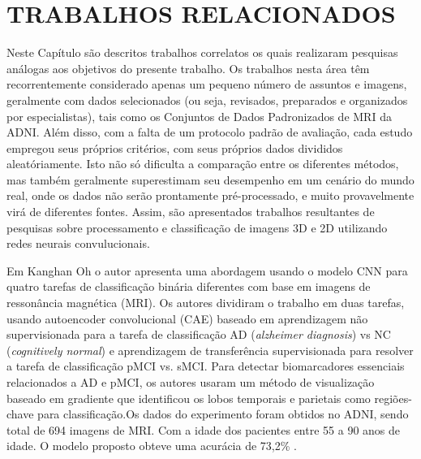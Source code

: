 \documentclass[openright]{UFRGS} %
\begin{document}
\chapter{TRABALHOS RELACIONADOS}

Neste Capítulo são descritos trabalhos correlatos os quais realizaram pesquisas análogas
aos objetivos do presente trabalho. Os trabalhos nesta área têm recorrentemente considerado apenas um pequeno número de assuntos e
imagens, geralmente com dados selecionados (ou seja, revisados, preparados e organizados por especialistas), tais
como os Conjuntos de Dados Padronizados de MRI da ADNI. Além disso, com a falta de um protocolo padrão de avaliação, cada estudo empregou seus próprios critérios, com seus próprios dados divididos aleatóriamente. Isto não só dificulta a comparação entre os diferentes métodos, mas também geralmente
superestimam seu desempenho em um cenário do mundo real, onde os dados não serão prontamente
pré-processado, e muito provavelmente virá de diferentes fontes. 
Assim, são apresentados trabalhos resultantes de pesquisas sobre  processamento e classificação de imagens 3D e 2D utilizando  redes neurais convulucionais.

Em Kanghan Oh o autor apresenta uma abordagem usando o modelo CNN para quatro tarefas de classificação binária diferentes com base em imagens de ressonância magnética (MRI). Os autores dividiram o trabalho em duas tarefas, usando autoencoder convolucional (CAE) baseado em aprendizagem não supervisionada para a tarefa de classificação AD (\textit{alzheimer diagnosis}) vs NC (\textit{cognitively normal}) e aprendizagem de transferência supervisionada para resolver a tarefa de classificação pMCI vs. sMCI. Para detectar biomarcadores essenciais relacionados a AD e pMCI, os autores usaram um método de visualização baseado em gradiente que identificou os lobos temporais e parietais como regiões-chave para classificação.Os dados do experimento foram obtidos no ADNI, sendo total de  694 imagens de MRI. Com a idade dos pacientes entre 55 a 90 anos de idade. O modelo proposto obteve uma acurácia de 73,2\% \cite{oh2019classification}.
\end{document}
